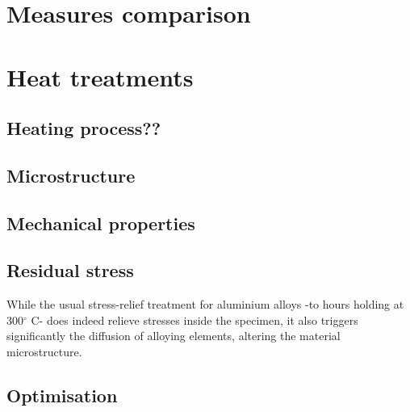 \section{Measures comparison}

\section{Heat treatments}

\subsection{Heating process??}

\subsection{Microstructure}

\subsection{Mechanical properties}

\subsection{Residual stress}

While the usual stress-relief treatment for aluminium alloys -to hours holding at 300$^\circ$ C- does indeed relieve stresses inside the specimen, it also triggers significantly the diffusion of alloying elements, altering the material microstructure.

\subsection{Optimisation}



